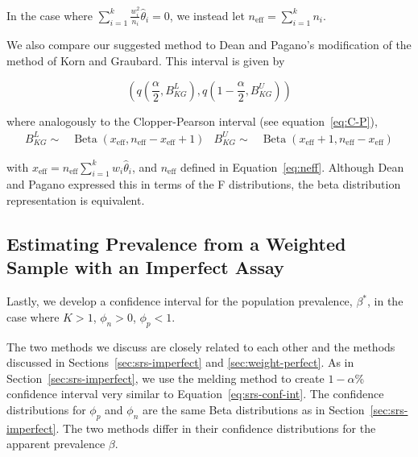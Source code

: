 \documentclass[AMA,STIX1COL]{WileyNJD-v2}
\begin{document}
In the case where \( \sum_{i=1}^k \frac{w_i^2}{n_i}\hat{\theta}_i = 0 \), we instead let \( n_{\text{eff}} = \sum_{i=1}^k n_i \).

We also compare our suggested method to Dean and Pagano's modification of the method of Korn and Graubard\cite{Korn:1998,Dean:2015}.
This interval is given by 

\begin{equation}
    \left( q \left( \frac{\alpha}{2}, B^L_{KG} \right), q \left( 1 - \frac{\alpha}{2}, B^U_{KG} \right)  \right)
\end{equation}

where analogously to the Clopper-Pearson interval (see equation~\ref{eq:C-P}),
\begin{align*}
    B^L_{KG} \sim& \operatorname{Beta}\left(x_{\text{eff}},  n_{\text{eff}} -  x_{\text{eff}} + 1 \right) &
    B^U_{KG} \sim& \operatorname{Beta}\left(x_{\text{eff}} + 1, n_{\text{eff}} - x_{\text{eff}} \right)
\end{align*}

with \( x_{\text{eff}} = n_{\text{eff}} \sum_{i=1}^k w_i \hat{\theta}_i \), and \( n_{\text{eff}} \) defined in Equation~\ref{eq:neff}.
Although Dean and Pagano \cite{Dean:2015} expressed this in terms of the F distributions, the beta distribution representation is equivalent.

\subsection{Estimating Prevalence from a Weighted Sample with an Imperfect Assay}
\label{sec:weight-imperfect}

Lastly, we develop a confidence interval for the population prevalence, \( \beta^* \), in the case where \( K > 1 \), \( \phi_n > 0 \), \( \phi_p < 1 \).

The two methods we discuss are closely related to each other and the methods discussed in Sections~\ref{sec:srs-imperfect} and \ref{sec:weight-perfect}.
As in Section~\ref{sec:srs-imperfect}, we use the melding method \cite{FayP:2015} to create \( 1 - \alpha \)\% confidence interval very similar to Equation~\ref{eq:srs-conf-int}.
The confidence distributions for \( \phi_p \) and \( \phi_n \) are the same Beta distributions as in Section~\ref{sec:srs-imperfect}.
The two methods differ in their confidence distributions for the apparent prevalence \( \beta \).
\end{document}
